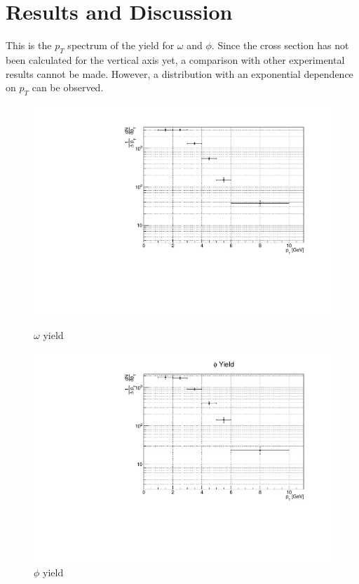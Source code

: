 \newpage
\clearpage
\section{Results and Discussion}
    This is the $p_T$ spectrum of the yield for $\omega$ and $\phi$. Since the cross section has not been calculated for the vertical axis yet, a comparison with other experimental results cannot be made. However, a distribution with an exponential dependence on $p_T$ can be observed.
    \begin{figure}[htbp]
        \centering
        \begin{minipage}{0.45\textwidth} %
            \centering
            \includegraphics[width=\textwidth]{fig/4_omega_yield.pdf} %
            \caption{$\omega$ yield}
            \label{fig:omega_yield}
        \end{minipage}
        \hfill
        \begin{minipage}{0.45\textwidth}
            \centering
            \includegraphics[width=\textwidth]{fig/4_phi_yield.pdf} %
            \caption{$\phi$ yield}
            \label{fig:phi_yield}
        \end{minipage}
    \end{figure}
